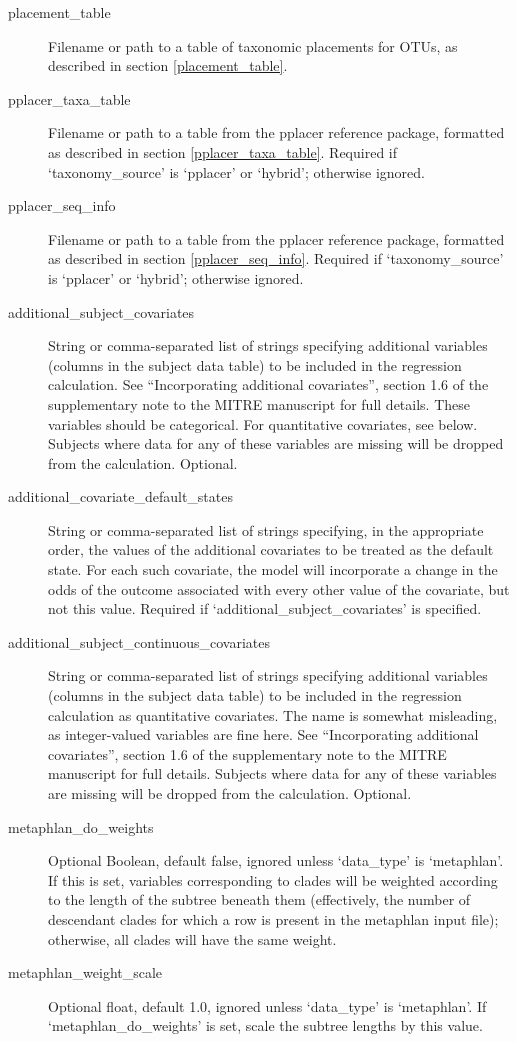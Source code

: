 \documentclass[12pt]{report}
\begin{document}
\begin{description}
\item[placement\_table] Filename or path to a table of taxonomic
  placements for OTUs, as described in section \ref{placement_table}.

\item[pplacer\_taxa\_table] Filename or path to a table from the
  pplacer reference package, formatted as described in section
  \ref{pplacer_taxa_table}. Required if `taxonomy\_source' is
  `pplacer' or `hybrid'; otherwise ignored.
\item[pplacer\_seq\_info] Filename or path to a table from the pplacer
  reference package, formatted as described in section
  \ref{pplacer_seq_info}. Required if `taxonomy\_source' is `pplacer'
  or `hybrid'; otherwise ignored.

\item[additional\_subject\_covariates] String or comma-separated list
  of strings specifying additional variables (columns in the subject
  data table) to be included in the regression calculation. See
  ``Incorporating additional covariates'', section 1.6 of the
  supplementary note to the MITRE manuscript for full details. These
  variables should be categorical. For quantitative covariates, see
  below. Subjects where data for any of these variables
  are missing will be dropped from the calculation. Optional.
\item[additional\_covariate\_default\_states] String or
  comma-separated list of strings specifying, in the appropriate
  order, the values of the additional covariates to be treated as the
  default state. For each such covariate, the model will incorporate a
  change in the odds of the outcome associated with every other value
  of the covariate, but not this value. Required if
  `additional\_subject\_covariates' is specified.
\item[additional\_subject\_continuous\_covariates] String or
  comma-separated list of strings specifying additional variables
  (columns in the subject data table) to be included in the regression
  calculation as quantitative covariates. The name is somewhat
  misleading, as integer-valued variables are fine here. See
  ``Incorporating additional covariates'', section 1.6 of the
  supplementary note to the MITRE manuscript for full
  details. Subjects where data for any of these variables are missing
  will be dropped from the calculation. Optional.

\item[metaphlan\_do\_weights] Optional Boolean, default false, ignored
  unless `data\_type' is `metaphlan'. If this is set, variables
  corresponding to clades will be weighted according to the length of
  the subtree beneath them (effectively, the number of descendant
  clades for which a row is present in the metaphlan input file);
  otherwise, all clades will have the same weight.
\item[metaphlan\_weight\_scale] Optional float, default 1.0, ignored
  unless `data\_type' is `metaphlan'. If `metaphlan\_do\_weights' is set,
  scale the subtree lengths by this value.

\end{description}
\end{document}
